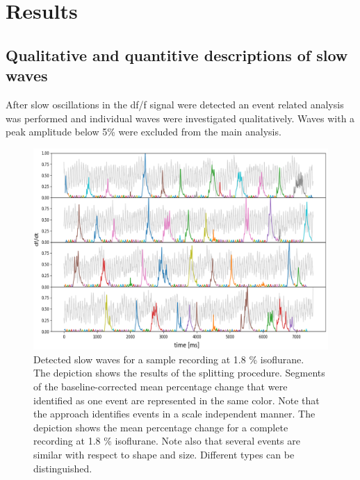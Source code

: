 
\chapter{Results} %

\label{Chapter4} %

\section{Qualitative and quantitive descriptions of slow waves}
After slow oscillations in the df/f signal were detected an event related analysis was performed and individual waves were investigated qualitatively. Waves with a peak amplitude below 5\% were excluded from the main analysis. 

\begin{figure}[!htb]
\centering
\includegraphics[width=\textwidth,height=\textheight,keepaspectratio]{Figures/slow_wave_segmentation}
\decoRule
\caption[Detected slow waves for a sample recording]{Detected slow waves for a sample recording at 1.8 \% isoflurane.\\ The depiction shows the results of the splitting procedure. Segments of the baseline-corrected mean percentage change that were identified as one event are represented in the same color. Note that the approach identifies events in a scale independent manner. The depiction shows the mean percentage change for a complete recording at 1.8 \% isoflurane. Note also that several events are similar with respect to shape and size. Different types can be distinguished.}
\label{fig:slow_wave_segmentation}
\end{figure}

